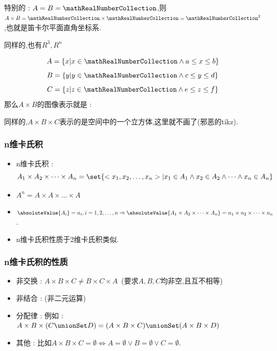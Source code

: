 {{{{    特别的 : $A = B = \mathRealNumberCollection$,则$A \times B = \mathRealNumberCollection \times \mathRealNumberCollection = \mathRealNumberCollection^2$,也就是笛卡尔平面直角坐标系.

    同样的,也有$R^3,R^n$


    $$
      A = \{x | x \in \mathRealNumberCollection \land a \leq x \leq b\}
    $$
    $$
      B = \{y | y \in \mathRealNumberCollection \land c \leq y \leq d\}
    $$
    $$
      C = \{z | z \in \mathRealNumberCollection \land e \leq z \leq f\}
    $$
    那么$A \times B$的图像表示就是 :
    \begin{center}
    \end{center}

    同样的,$A \times B \times C$表示的是空间中的一个立方体,这里就不画了(邪恶的tikz).
  }%

  \subsubsection{n维卡氏积}{
    \begin{itemize}
      \item n维卡氏积 : $$
              A_1 \times A_2 \times \dots \times A_n = \set{<x_1,x_2,\dots,x_n> | x_1 \in A_1 \land x_2 \in A_2 \land \dots \land x_n \in A_n}
            $$
      \item $A^n = A \times A \times \dots \times A$
      \item $\absoluteValue{A_i} = n_i,i = 1,2,\dots,n \Rightarrow \absoluteValue{A_1 \times A_2 \times \dots \times A_n} = n_1 \times n_2 \times \dots \times n_n$.
      \item n维卡氏积性质于2维卡氏积类似.
    \end{itemize}
  }%

  \subsubsection{n维卡氏积的性质}{
    \begin{itemize}
      \item 非交换 : $A \times B \times C \neq B \times C \times A$\ (要求$A,B,C$均非空,且互不相等)
      \item 非结合 : (非二元运算)
      \item 分配律 : 例如 : $A \times B \times (C \unionSet D) = (A \times B \times C) \unionSet (A \times B \times D)$
      \item 其他 : 比如$A \times B \times C = \emptyset \Leftrightarrow A = \emptyset \lor B = \emptyset \lor C = \emptyset$.
    \end{itemize}
  }%

}}}
